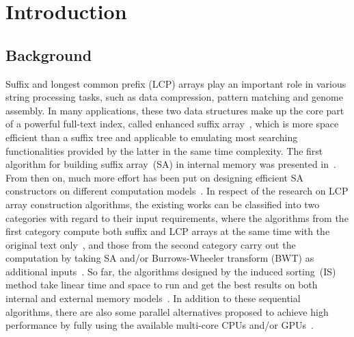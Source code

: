 \documentclass[10pt,journal,compsoc]{IEEEtran}
\begin{document}
\IEEEdisplaynontitleabstractindextext

\IEEEpeerreviewmaketitle

\section{Introduction}\label{sec:introduction}

\subsection{Background} \label{sec:introduction:background}

Suffix and longest common prefix (LCP) arrays play an important role in various string processing tasks, such as data compression, pattern matching and genome assembly. In many applications, these two data structures make up the core part of a powerful full-text index, called enhanced suffix array~\cite{Abouelhodaa2004}, which is more space efficient than a suffix tree and applicable to emulating most searching functionalities provided by the latter in the same time complexity. The first algorithm for building suffix array~(SA) in internal memory was presented in~\cite{Manber1993}. From then on, much more effort has been put on designing efficient SA constructors on different computation models~\cite{Karkkainen2003, Ko2003, Kim2003, Nong11, Dementiev2008, Ferragina2012, Manzini2004, Bingmann12, Karkkainen2014, Nong14, Nong15}. In respect of the research on LCP array construction algorithms, the existing works can be classified into two categories with regard to their input requirements, where the algorithms from the first category compute both suffix and LCP arrays at the same time with the original text only~\cite{Fischer11, Bingmann12, Flick2015}, and those from the second category carry out the computation by taking SA and/or Burrows-Wheeler transform (BWT) as additional inputs~\cite{Kasai2001,Karkkainen2009, Fischer11, Puglisi2008, Deo2013}. So far, the algorithms designed by the induced sorting~(IS) method take linear time and space to run and get the best results on both internal and external memory models~\cite{Nong11, Karkkainen2014, Karkkainen2017}. In addition to these sequential algorithms, there are also some parallel alternatives proposed to achieve high performance by fully using the available multi-core CPUs and/or GPUs~\cite{Osipov2012, Deo2013, Wang2015, Karkkainen2015, Karkkainen2016}.
\end{document}
